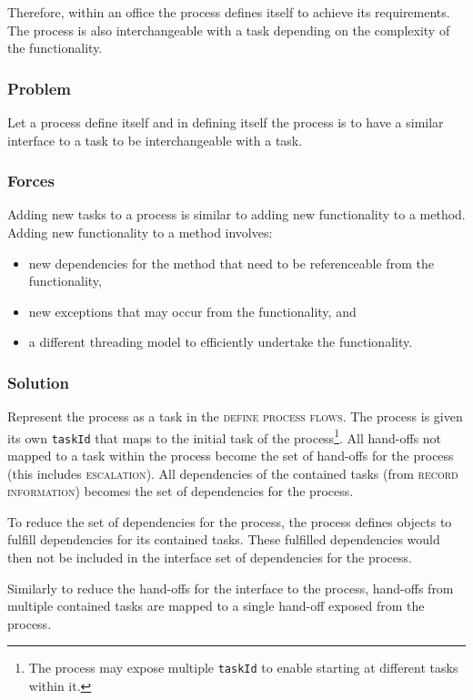 \documentclass[prodmode]{style/acmlarge}
\begin{document}
Therefore, within an office the process defines itself to achieve its
requirements.  The process is also interchangeable with a task depending on the
complexity of the functionality.

\subsubsection*{Problem} Let a process define itself and in defining itself
the process is to have a similar interface to a task to be interchangeable with
a task.

\subsubsection*{Forces} Adding new tasks to a process is similar to adding new
functionality to a method.  Adding new functionality to a method involves:
\begin{itemize}
  \item new dependencies for the method that need to be referenceable from the functionality,
  \item new exceptions that may occur from the functionality, and
  \item a different threading model to efficiently undertake the functionality. 
\end{itemize}

\subsubsection*{Solution} Represent the process as a task in the \textsc{define
process flows}.  The process is given its own \texttt{taskId} that maps to the
initial task of the process\footnote{The process may expose multiple
\texttt{taskId} to enable starting at different tasks within it.}.  All
hand-offs not mapped to a task within the process become the set of hand-offs
for the process (this includes \textsc{escalation}).  All dependencies of the
contained tasks (from \textsc{record information}) becomes the set of
dependencies for the process.

To reduce the set of dependencies for the process, the process defines objects
to fulfill dependencies for its contained tasks.  These fulfilled dependencies
would then not be included in the interface set of dependencies for the process.

Similarly to reduce the hand-offs for the interface to the process, hand-offs
from multiple contained tasks are mapped to a single hand-off exposed from the
process.
\end{document}
